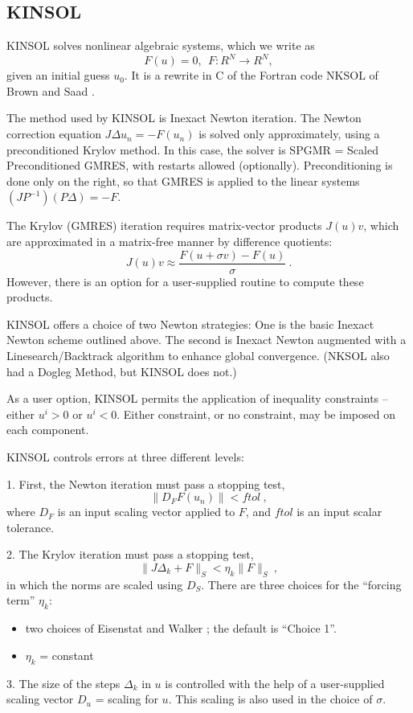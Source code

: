 \subsection{KINSOL}

KINSOL solves nonlinear algebraic systems, which we write as
\[ F(u) = 0,~~ F:R^N \rightarrow R^N, \]
given an initial guess $u_0$.  It is a rewrite in C of the Fortran
code NKSOL of Brown and Saad \cite{NKSOL}.

The method used by KINSOL is Inexact Newton iteration.  The Newton
correction equation $J \Delta u_n = -F(u_n)$ is solved only
approximately, using a preconditioned Krylov method.  In this case,
the solver is SPGMR = Scaled Preconditioned GMRES, with restarts
allowed (optionally).  Preconditioning is done only on the right, so
that GMRES is applied to the linear systems $(JP^{-1})(P\Delta) = -F$.

The Krylov (GMRES) iteration requires matrix-vector products $J(u)v$,
which are approximated in a matrix-free manner by difference quotients:
\[ J(u)v \approx \frac{F(u+\sigma v) - F(u)}{\sigma} ~. \]
However, there is an option for a user-supplied routine to compute
these products.

KINSOL offers a choice of two Newton strategies: One is the basic
Inexact Newton scheme outlined above.  The second is Inexact Newton
augmented with a Linesearch/Backtrack algorithm to enhance global
convergence.  (NKSOL also had a Dogleg Method, but KINSOL does not.)

As a user option, KINSOL permits the application of inequality
constraints -- either $u^i > 0$ or $u^i < 0$.  Either constraint, or
no constraint, may be imposed on each component.

KINSOL controls errors at three different levels:

1. First, the Newton iteration must pass a stopping test,
\[ \|D_F F(u_n)\| < ftol ~, \]
where $D_F$ is an input scaling vector applied to $F$, and $ftol$ is
an input scalar tolerance.

2. The Krylov iteration must pass a stopping test,
\[ \|J \Delta_k + F\|_S < \eta_k \|F\|_S ~, \]
in which the norms are scaled using $D_S$.  There are three choices
for the ``forcing term'' $\eta_k$:
\vspace*{-.19in}
\begin{itemize}
\item two choices of Eisenstat and Walker \cite{EiWa96}; the default
is ``Choice 1''.
\item  $\eta_k$ = constant
\end{itemize}

3. The size of the steps $\Delta_k$ in $u$ is controlled with the help
of a user-supplied scaling vector $D_u$ = scaling for $u$.  This
scaling is also used in the choice of $\sigma$.


